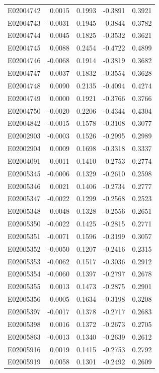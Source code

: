 \documentclass[11pt, a4paper]{article}
\begin{document}
\begin{longtable}{lrrrr}
E02004742 & 0.0015 & 0.1993 & -0.3891 & 0.3921 \\
E02004743 & -0.0031 & 0.1945 & -0.3844 & 0.3782 \\
E02004744 & 0.0045 & 0.1825 & -0.3532 & 0.3621 \\
E02004745 & 0.0088 & 0.2454 & -0.4722 & 0.4899 \\
E02004746 & -0.0068 & 0.1914 & -0.3819 & 0.3682 \\
E02004747 & 0.0037 & 0.1832 & -0.3554 & 0.3628 \\
E02004748 & 0.0090 & 0.2135 & -0.4094 & 0.4274 \\
E02004749 & 0.0000 & 0.1921 & -0.3766 & 0.3766 \\
E02004750 & -0.0020 & 0.2206 & -0.4344 & 0.4304 \\
E02004842 & -0.0015 & 0.1578 & -0.3108 & 0.3077 \\
E02002903 & -0.0003 & 0.1526 & -0.2995 & 0.2989 \\
E02002904 & 0.0009 & 0.1698 & -0.3318 & 0.3337 \\
E02004091 & 0.0011 & 0.1410 & -0.2753 & 0.2774 \\
E02005345 & -0.0006 & 0.1329 & -0.2610 & 0.2598 \\
E02005346 & 0.0021 & 0.1406 & -0.2734 & 0.2777 \\
E02005347 & -0.0022 & 0.1299 & -0.2568 & 0.2523 \\
E02005348 & 0.0048 & 0.1328 & -0.2556 & 0.2651 \\
E02005350 & -0.0022 & 0.1425 & -0.2815 & 0.2771 \\
E02005351 & -0.0071 & 0.1596 & -0.3199 & 0.3057 \\
E02005352 & -0.0050 & 0.1207 & -0.2416 & 0.2315 \\
E02005353 & -0.0062 & 0.1517 & -0.3036 & 0.2912 \\
E02005354 & -0.0060 & 0.1397 & -0.2797 & 0.2678 \\
E02005355 & 0.0013 & 0.1473 & -0.2875 & 0.2901 \\
E02005356 & 0.0005 & 0.1634 & -0.3198 & 0.3208 \\
E02005397 & -0.0017 & 0.1378 & -0.2717 & 0.2683 \\
E02005398 & 0.0016 & 0.1372 & -0.2673 & 0.2705 \\
E02005863 & -0.0013 & 0.1340 & -0.2639 & 0.2612 \\
E02005916 & 0.0019 & 0.1415 & -0.2753 & 0.2792 \\
E02005919 & 0.0058 & 0.1301 & -0.2492 & 0.2609 \\

\end{longtable}
\end{document}
